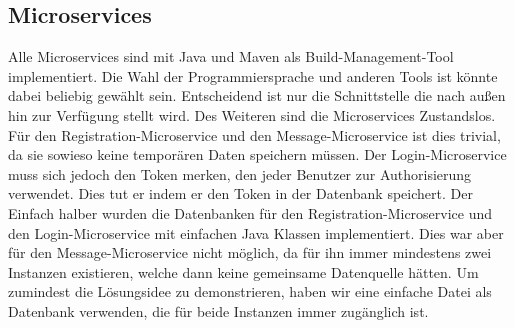 \subsection{Microservices}
Alle Microservices sind mit Java und Maven als Build-Management-Tool implementiert. Die Wahl der Programmiersprache und anderen Tools ist könnte dabei beliebig gewählt sein. Entscheidend ist nur die Schnittstelle die nach außen hin zur Verfügung stellt wird. Des Weiteren sind die Microservices Zustandslos. Für den Registration-Microservice und den Message-Microservice ist dies trivial, da sie sowieso keine temporären Daten speichern müssen. Der Login-Microservice muss sich jedoch den Token merken, den jeder Benutzer zur Authorisierung verwendet. Dies tut er indem er den Token in der Datenbank speichert.
Der Einfach halber wurden die Datenbanken für den Registration-Microservice und den Login-Microservice mit einfachen Java Klassen implementiert. Dies war aber für den Message-Microservice nicht möglich, da für ihn immer mindestens zwei Instanzen existieren, welche dann keine gemeinsame Datenquelle hätten. Um zumindest die Lösungsidee zu demonstrieren, haben wir eine einfache Datei als Datenbank verwenden, die für beide Instanzen immer zugänglich ist.